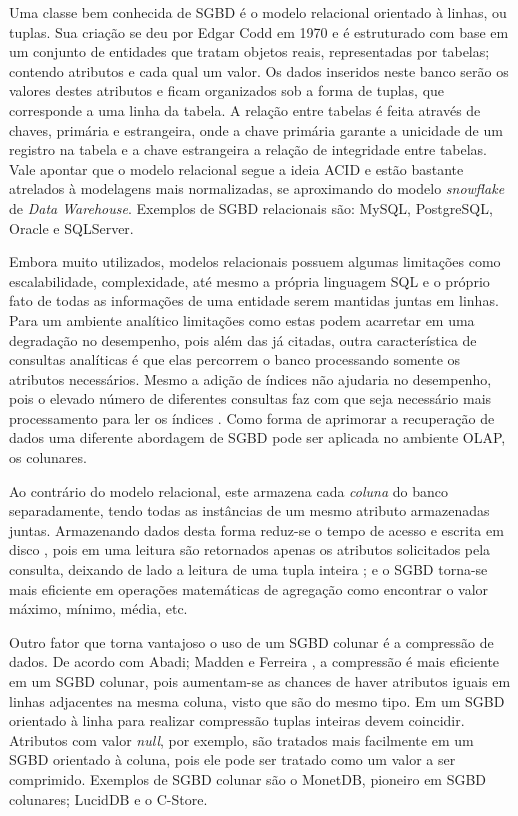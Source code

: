 \documentclass[conference]{IEEEtran}
\begin{document}
Uma classe bem conhecida de SGBD é o modelo relacional \cite{brito2010bancos} orientado à linhas, ou tuplas. Sua criação se deu por Edgar Codd em 1970 \cite{codd1970relational} e é estruturado com base em um conjunto de entidades que tratam objetos reais, representadas por tabelas; contendo atributos e cada qual um valor. Os dados inseridos neste banco serão os valores destes atributos e ficam organizados sob a forma de tuplas, que corresponde a uma linha da tabela. A relação entre tabelas é feita através de chaves, primária e estrangeira, onde a chave primária garante a unicidade de um registro na tabela e a chave estrangeira a relação de integridade entre tabelas. Vale apontar que o modelo relacional segue a ideia ACID e estão bastante atrelados à modelagens mais normalizadas, se aproximando do modelo \textit{snowflake} de \textit{Data Warehouse}. Exemplos de SGBD relacionais são: MySQL, PostgreSQL, Oracle e SQLServer.

Embora muito utilizados, modelos relacionais possuem algumas limitações como escalabilidade, complexidade, até mesmo a própria linguagem SQL \cite{leavitt2010will} e o próprio fato de todas as informações de uma entidade serem mantidas juntas em linhas. Para um ambiente analítico limitações como estas podem acarretar em uma degradação no desempenho, pois além das já citadas, outra característica de consultas analíticas é que elas percorrem o banco processando somente os atributos necessários. Mesmo a adição de índices não ajudaria no desempenho, pois o elevado número de diferentes consultas faz com que seja necessário mais processamento para ler os índices \cite{matei2010column}. Como forma de aprimorar a recuperação de dados uma diferente abordagem de SGBD pode ser aplicada no ambiente OLAP, os colunares. 

Ao contrário do modelo relacional, este armazena cada \textit{coluna} do banco separadamente, tendo todas as instâncias de um mesmo atributo armazenadas juntas. Armazenando dados desta forma reduz-se o tempo de acesso e escrita em disco \cite{matei2010column, abadi2008query}, pois em uma leitura são retornados apenas os atributos solicitados pela consulta, deixando de lado a leitura de uma tupla inteira \cite{khoshafian1987query}; e o SGBD torna-se mais eficiente em operações matemáticas de agregação \cite{matei2010column} como encontrar o valor máximo, mínimo, média, etc.

Outro fator que torna vantajoso o uso de um SGBD colunar é a compressão de dados. De acordo com Abadi; Madden e Ferreira \cite{abadi2006integrating}, a compressão é mais eficiente em um SGBD colunar, pois aumentam-se as chances de haver atributos iguais em linhas adjacentes na mesma coluna, visto que são do mesmo tipo. Em um SGBD orientado à linha para realizar compressão tuplas inteiras devem coincidir. Atributos com valor \textit{null}, por exemplo, são tratados mais facilmente em um SGBD orientado à coluna, pois ele pode ser tratado como um valor a ser comprimido. Exemplos de SGBD colunar são o MonetDB, pioneiro em SGBD colunares; LucidDB e o C-Store.
\end{document}
